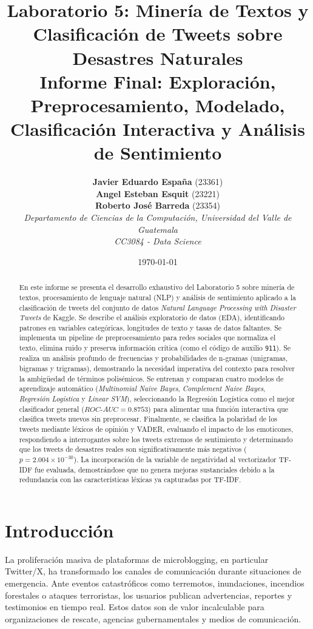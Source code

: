 \documentclass[11pt,a4paper]{article}
\title{\textbf{Laboratorio 5: Minería de Textos y Clasificación de Tweets sobre Desastres Naturales}\\
\large Informe Final: Exploración, Preprocesamiento, Modelado, Clasificación Interactiva y Análisis de Sentimiento}
\author{
    \textbf{Javier Eduardo España} (23361)\\
    \textbf{Angel Esteban Esquit} (23221)\\
    \textbf{Roberto José Barreda} (23354)\\[0.5em]
    \textit{Departamento de Ciencias de la Computación, Universidad del Valle de Guatemala}\\
    \textit{CC3084 - Data Science}
}
\date{\today}
\begin{document}
\maketitle

\begin{abstract}
En este informe se presenta el desarrollo exhaustivo del Laboratorio 5 sobre minería de textos, procesamiento de lenguaje natural (NLP) y análisis de sentimiento aplicado a la clasificación de tweets del conjunto de datos \textit{Natural Language Processing with Disaster Tweets} de Kaggle. Se describe el análisis exploratorio de datos (EDA), identificando patrones en variables categóricas, longitudes de texto y tasas de datos faltantes. Se implementa un pipeline de preprocesamiento para redes sociales que normaliza el texto, elimina ruido y preserva información crítica (como el código de auxilio \texttt{911}). Se realiza un análisis profundo de frecuencias y probabilidades de n-gramas (unigramas, bigramas y trigramas), demostrando la necesidad imperativa del contexto para resolver la ambigüedad de términos polisémicos. Se entrenan y comparan cuatro modelos de aprendizaje automático (\textit{Multinomial Naive Bayes}, \textit{Complement Naive Bayes}, \textit{Regresión Logística} y \textit{Linear SVM}), seleccionando la Regresión Logística como el mejor clasificador general ($ROC\text{-}AUC = 0.8753$) para alimentar una función interactiva que clasifica tweets nuevos sin preprocesar. Finalmente, se clasifica la polaridad de los tweets mediante léxicos de opinión y VADER, evaluando el impacto de los emoticones, respondiendo a interrogantes sobre los tweets extremos de sentimiento y determinando que los tweets de desastres reales son significativamente más negativos ($p = 2.004 \times 10^{-30}$). La incorporación de la variable de negatividad al vectorizador TF-IDF fue evaluada, demostrándose que no genera mejoras sustanciales debido a la redundancia con las características léxicas ya capturadas por TF-IDF.
\end{abstract}

\section{Introducción}
La proliferación masiva de plataformas de microblogging, en particular Twitter/X, ha transformado los canales de comunicación durante situaciones de emergencia. Ante eventos catastróficos como terremotos, inundaciones, incendios forestales o ataques terroristas, los usuarios publican advertencias, reportes y testimonios en tiempo real. Estos datos son de valor incalculable para organizaciones de rescate, agencias gubernamentales y medios de comunicación.
\end{document}
